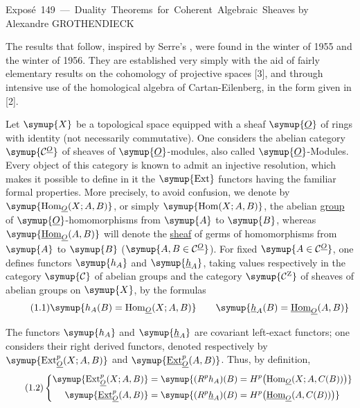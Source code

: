\unit{Exposé 149 — Duality Theorems for Coherent Algebraic Sheaves}
%
  {by Alexandre GROTHENDIECK}

The results that follow, inspired by Serre's ,
were found in the winter of 1955 and the winter of 1956. They are established
very simply with the aid of fairly elementary results on the cohomology of
projective spaces [3], and through intensive use of the homological algebra of
Cartan-Eilenberg, in the form given in [2].


Let $\symup{X}$ be a topological space equipped with a sheaf $\symup{\Osh}$ of rings with
identity (not necessarily commutative). One considers the abelian category
$\symup{\Ccat^{\Osh}}$ of sheaves of $\symup{\Osh}$-modules, also called $\symup{\Osh}$-Modules. Every
object of this category is known to admit an injective resolution, which makes
it possible to define in it the $\symup{\operatorname{Ext}}$ functors having the familiar
formal properties. More precisely, to avoid confusion, we denote by
$\symup{\operatorname{Hom}_{\Osh}(X;A,B)}$, or simply $\symup{\operatorname{Hom}(X;A,B)}$, the
abelian \underline{group} of $\symup{\Osh}$-homomorphisms from $\symup{A}$ to $\symup{B}$, whereas
$\symup{\Homsh_{\Osh}(A,B)}$ will denote the \underline{sheaf} of germs of homomorphisms from $\symup{A}$ to
$\symup{B}$ ($\symup{A,B\in\Ccat^{\Osh}}$). For fixed $\symup{A\in\Ccat^{\Osh}}$, one defines functors
$\symup{h_A}$ and $\symup{\hsh_A}$, taking values respectively in the category $\symup{\Ccat}$ of
abelian groups and the category $\symup{\Ccat^{\mathrm Z}}$ of sheaves of abelian groups on
$\symup{X}$, by the formulas
\begin{equation}\tag{1.1}
  \symup{h_A(B)=\operatorname{Hom}_{\Osh}(X;A,B)}
  \qquad
  \symup{\hsh_A(B)=\Homsh_{\Osh}(A,B)}
\end{equation}

The functors $\symup{h_A}$ and $\symup{\hsh_A}$ are covariant left-exact functors; one considers
their right derived functors, denoted respectively by
$\symup{\operatorname{Ext}_{\Osh}^{p}(X;A,B)}$ and $\symup{\Extsh_{\Osh}^{p}(A,B)}$. Thus, by
definition,
\begin{equation}\tag{1.2}
\left\{
\begin{aligned}
\symup{\operatorname{Ext}_{\Osh}^{p}(X;A,B)}
  &= \symup{(R^{p}h_A)(B)
   = H^{p}\bigl(\operatorname{Hom}_{\Osh}(X;A,C(B))\bigr)}\\
\symup{\Extsh_{\Osh}^{p}(A,B)}
  &= \symup{(R^{p}\hsh_A)(B)
   = H^{p}\bigl(\Homsh_{\Osh}(A,C(B))\bigr)}
\end{aligned}
\right.
\end{equation}

